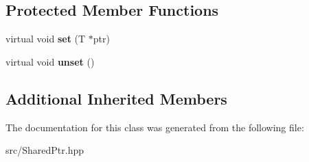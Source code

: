 \subsection*{Protected Member Functions}
\begin{DoxyCompactItemize}
\item 
\mbox{\label{classathome_1_1utility_1_1memory_1_1_shared_ptr_ace6553c87bb09d0250359961a02e2dac}} 
virtual void {\bfseries set} (T $\ast$ptr)
\item 
\mbox{\label{classathome_1_1utility_1_1memory_1_1_shared_ptr_ae3283a127a4ec1c7efc8deaacd15801b}} 
virtual void {\bfseries unset} ()
\end{DoxyCompactItemize}
\subsection*{Additional Inherited Members}


The documentation for this class was generated from the following file\+:\begin{DoxyCompactItemize}
\item 
src/Shared\+Ptr.\+hpp\end{DoxyCompactItemize}
